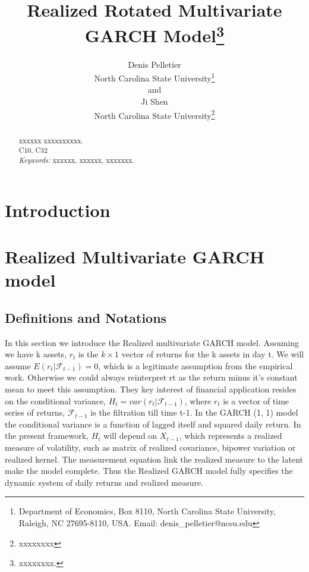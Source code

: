 \documentclass[titlepage,11pt]{article}
\begin{document}
\title{Realized Rotated Multivariate GARCH Model\thanks{xxxxxxxx.}}
\author {Denis Pelletier\\North Carolina
State University\thanks{Department of Economics, Box 8110, North
	Carolina State University, Raleigh, NC 27695-8110, USA. Email:
	denis\_pelletier@ncsu.edu}\\and\\Ji Shen\\North Carolina
State University\thanks{xxxxxxxx}}
\maketitle
\thispagestyle{empty}
\newpage
\begin{abstract}
xxxxxx xxxxxxxxxx.\\[0.2in]

 C10, C32\\
{\it Keywords:} xxxxxx, xxxxxx, xxxxxxx.
\end{abstract}
\section{Introduction}



\section{Realized Multivariate GARCH model}
\subsection{Definitions and Notations}
In this section we introduce the Realized multivariate GARCH model. Assuming we have k assets, $r_t$ is the $k \times 1$ vector of returns for the k assets in day t. We will assume $E(r_t|\mathcal{F}_{t-1})=0 $, which is a legitimate assumption from the empirical work. Otherwise we could always reinterpret rt as the return minus it's constant mean to meet this assumption. They key interest of financial application resides on the conditional variance, $H_t=var(r_t|\mathcal{F}_{t-1})$, where $r_t$ is a vector of time series of returns, $\mathcal{F}_{t-1}$ is the filtration till time t-1. In the GARCH (1, 1) model the conditional variance is a function of lagged itself and squared daily return. In the present framework, $H_t$ will depend on $X_{t-1}$, which represents a realized measure of volatility, such as matrix of realized covariance, bipower variation or realized kernel. The measurement equation link the realized measure to the latent make the model complete. Thus the Realized GARCH model fully specifies the dynamic system of daily returns and realized measure.
 
\end{document}
